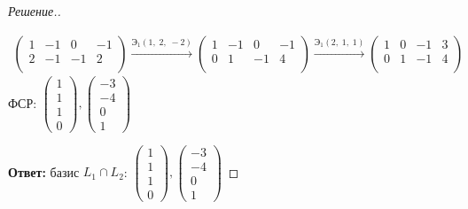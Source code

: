 \documentclass[a4paper]{article}
\theoremstyle{remark}
\newcommand{\arron}[3]{%
  \ensuremath{\xrightarrow{\text{Э}_1(#1,\; #2,\; #3)}}%
}
\begin{document}
\begin{proof}[Решение.]
\begin{enumerate}
\begin{multline*}
\begin{pmatrix}
                        1 & -1 & 0 & -1 \\
                        2 & -1 & -1 & 2 \\
                    \end{pmatrix} 
                    \arron{1}{2}{-2}
                    \begin{pmatrix}
                        1 & -1 & 0 & -1 \\
                        0 & 1 & -1 & 4 \\
                    \end{pmatrix} 
                    \arron{2}{1}{1}
                    \begin{pmatrix}
                        1 & 0 & -1 & 3 \\
                        0 & 1 & -1 & 4 \\
                    \end{pmatrix} 
                \end{multline*}
                ФСР: $
                \begin{pmatrix}
                    1\\
                    1\\
                    1\\
                    0
                \end{pmatrix}, 
                \begin{pmatrix}
                    -3\\
                    -4\\
                    0\\
                    1
                \end{pmatrix}
                $
            \end{enumerate}
            \textbf{Ответ:} базис $L_1 \cap L_2$: $
            \begin{pmatrix}
                1\\
                1\\
                1\\
                0
            \end{pmatrix}, 
            \begin{pmatrix}
                -3\\
                -4\\
                0\\
                1
            \end{pmatrix}
            $

        \end{proof}
\end{document}
